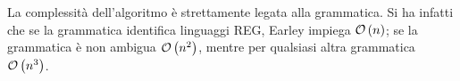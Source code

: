\documentclass{subfiles}
\begin{document}
La complessità dell'algoritmo è strettamente legata alla grammatica.
Si ha infatti che se la grammatica identifica linguaggi REG, Earley impiega $\operatorname{\mathcal{O}} \left(n\right)$;
se la grammatica è non ambigua $\operatorname{\mathcal{O}} \left(n^{2}\right)$, mentre per qualsiasi altra grammatica $\operatorname{\mathcal{O}} \left(n^{3}\right)$.
\end{document}
